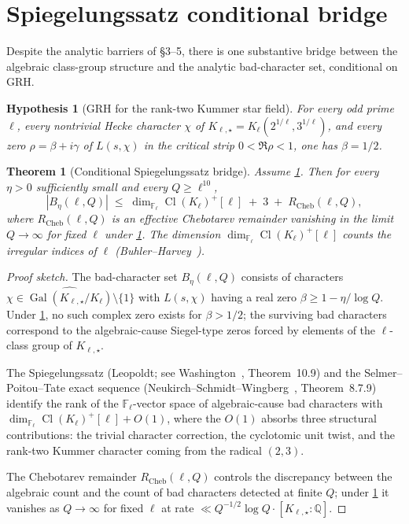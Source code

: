 \documentclass[11pt]{article}
\newtheorem{theorem}{Theorem}
\newtheorem{hypothesis}{Hypothesis}
\newcommand{\Q}{\mathbb Q}
\newcommand{\F}{\mathbb F}
\newcommand{\Gal}{\operatorname{Gal}}
\newcommand{\Cl}{\operatorname{Cl}}
\begin{document}
\section{Spiegelungssatz conditional bridge}

Despite the analytic barriers of §3–5, there is one substantive bridge between the algebraic class-group structure and the analytic bad-character set, conditional on GRH.

\begin{hypothesis}[GRH for the rank-two Kummer star field]\label{H:GRH-star}
For every odd prime \(\ell\), every nontrivial Hecke character \(\chi\) of \(K_{\ell,\star}=K_\ell(2^{1/\ell},3^{1/\ell})\), and every zero \(\rho=\beta+i\gamma\) of \(L(s,\chi)\) in the critical strip \(0<\Re\rho<1\), one has \(\beta=1/2\).
\end{hypothesis}

\begin{theorem}[Conditional Spiegelungssatz bridge]\label{T:spiegel-bridge}
Assume \cref{H:GRH-star}.  Then for every \(\eta>0\) sufficiently small and every \(Q\ge\ell^{10}\),
\[
|B_\eta(\ell,Q)|\;\le\;\dim_{\F_\ell}\Cl(K_\ell)^+[\ell]\;+\;3\;+\;R_{\mathrm{Cheb}}(\ell,Q),
\]
where \(R_{\mathrm{Cheb}}(\ell,Q)\) is an effective Chebotarev remainder vanishing in the limit \(Q\to\infty\) for fixed \(\ell\) under \cref{H:GRH-star}.  The dimension \(\dim_{\F_\ell}\Cl(K_\ell)^+[\ell]\) counts the irregular indices of \(\ell\) (Buhler--Harvey~\cite{BuhlerHarvey}).
\end{theorem}

\begin{proof}[Proof sketch]
The bad-character set \(B_\eta(\ell,Q)\) consists of characters \(\chi\in\widehat{\Gal(K_{\ell,\star}/K_\ell)}\setminus\{1\}\) with \(L(s,\chi)\) having a real zero \(\beta\ge 1-\eta/\log Q\).  Under \cref{H:GRH-star}, no such complex zero exists for \(\beta>1/2\); the surviving bad characters correspond to the algebraic-cause Siegel-type zeros forced by elements of the \(\ell\)-class group of \(K_{\ell,\star}\).

The Spiegelungssatz (Leopoldt; see Washington~\cite{Washington}, Theorem~10.9) and the Selmer--Poitou--Tate exact sequence (Neukirch--Schmidt--Wingberg~\cite{NSW}, Theorem~8.7.9) identify the rank of the \(\F_\ell\)-vector space of algebraic-cause bad characters with \(\dim_{\F_\ell}\Cl(K_\ell)^+[\ell]+O(1)\), where the \(O(1)\) absorbs three structural contributions: the trivial character correction, the cyclotomic unit twist, and the rank-two Kummer character coming from the radical \((2,3)\).

The Chebotarev remainder \(R_{\mathrm{Cheb}}(\ell,Q)\) controls the discrepancy between the algebraic count and the count of bad characters detected at finite \(Q\); under \cref{H:GRH-star} it vanishes as \(Q\to\infty\) for fixed \(\ell\) at rate \(\ll Q^{-1/2}\log Q\cdot[K_{\ell,\star}:\Q]\).
\end{proof}
\end{document}
